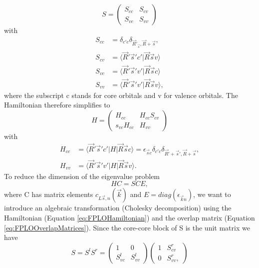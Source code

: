 			\begin{equation}
				\label{eq:FPLOOverlapMatrices}
				S = 
				\begin{pmatrix}
					S_{cc} & S_{cv} \\
					S_{vc} & S_{vv}
				\end{pmatrix}
			\end{equation} 
			with
			\begin{align}
				S_{cc} &= \delta_{c'c} \delta_{\vec R' _ \vec s, \vec R + \vec s}, \\
				S_{cv} &= \langle \vec R' \vec s'c'| \vec R \vec s v \rangle \\
				S_{vc} &= \langle \vec R' \vec s' v' | \vec R \vec s c \rangle \\
				S_{vv} &= \langle \vec R'\vec s'v'| \vec R \vec s v \rangle,
			\end{align}
			where the subscript c stands for core orbitals and v for valence orbitals. The Hamiltonian therefore simplifies to 
			\begin{equation}
				\label{eq:FPLOHamiltonian}
				H = 
				\begin{pmatrix}
					H_{cc} & H_{cc} S_{cv} \\
					s_{vc} H_{cc} & H_{vv}
				\end{pmatrix}
			\end{equation}
			with 
			\begin{align}
				H_{cc} &= \langle \vec R'\vec s'c'| H | \vec R \vec s c \rangle = \epsilon_{\vec s c} \delta_{c'c} \delta_{\vec R'+ \vec s', \vec R + \vec s}, \\
				H_{vv} &= \langle  \vec R'\vec s' v' | H | \vec R \vec s v \rangle.
			\end{align}
			To reduce the dimension of the eigenvalue problem
			\begin{equation}
				\label{eq:FPLOEigenvalueProblem}
				HC = SCE,
			\end{equation}
			where C has matrix elements $c_{L \vec s , n}(\vec k)$ and $E= diag(\epsilon_{\vec k n})$, we want to introduce an algebraic transformation (Cholesky decomposition) using the Hamiltonian (Equation \ref{eq:FPLOHamiltonian}) and the overlap matrix (Equation \ref{eq:FPLOOverlapMatrices}). Since the core-core block of S is the unit matrix we have
			\begin{equation}
				S = S^l S^r = 
				\begin{pmatrix}
					1 & 0 \\
					S_{vc}^l & S_{vv}^l 
				\end{pmatrix}
				\begin{pmatrix}
					1 & S_{cv}^r \\
					0 & S_{vv}^r,
				\end{pmatrix}
			\end{equation}
